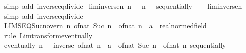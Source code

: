 \begin{isabellebody}
\ {\isacharparenleft}{\kern0pt}simp\ add{\isacharcolon}{\kern0pt}\ inverse{\isacharunderscore}{\kern0pt}eq{\isacharunderscore}{\kern0pt}divide{\isacharparenright}{\kern0pt}%
\endisatagproof
{\isafoldproof}%
%
\isadelimproof
\isanewline
%
\endisadelimproof
\isanewline
{}\isamarkupfalse%
\ lim{\isacharunderscore}{\kern0pt}inverse{\isacharunderscore}{\kern0pt}n{\isacharprime}{\kern0pt}{\isacharcolon}{\kern0pt}\ {\isachardoublequoteopen}{\isacharparenleft}{\kern0pt}{\isacharparenleft}{\kern0pt}{\isasymlambda}n{\isachardot}{\kern0pt}\ {}\ {\isacharslash}{\kern0pt}\ n{\isacharparenright}{\kern0pt}\ {\isasymlonglongrightarrow}\ {}{\isacharparenright}{\kern0pt}\ sequentially{\isachardoublequoteclose}\isanewline
%
\isadelimproof
\ \ %
\endisadelimproof
%
\isatagproof
{}\isamarkupfalse%
\ lim{\isacharunderscore}{\kern0pt}inverse{\isacharunderscore}{\kern0pt}n\isanewline
\ \ \isamarkupfalse%
\ {\isacharparenleft}{\kern0pt}simp\ add{\isacharcolon}{\kern0pt}\ inverse{\isacharunderscore}{\kern0pt}eq{\isacharunderscore}{\kern0pt}divide{\isacharparenright}{\kern0pt}%
\endisatagproof
{\isafoldproof}%
%
\isadelimproof
\isanewline
%
\endisadelimproof
\isanewline
{}\isamarkupfalse%
\ LIMSEQ{\isacharunderscore}{\kern0pt}Suc{\isacharunderscore}{\kern0pt}n{\isacharunderscore}{\kern0pt}over{\isacharunderscore}{\kern0pt}n{\isacharcolon}{\kern0pt}\ {\isachardoublequoteopen}{\isacharparenleft}{\kern0pt}{\isasymlambda}n{\isachardot}{\kern0pt}\ of{\isacharunderscore}{\kern0pt}nat\ {\isacharparenleft}{\kern0pt}Suc\ n{\isacharparenright}{\kern0pt}\ {\isacharslash}{\kern0pt}\ of{\isacharunderscore}{\kern0pt}nat\ n\ {\isacharcolon}{\kern0pt}{\isacharcolon}{\kern0pt}\ {\isacharprime}{\kern0pt}a\ {\isacharcolon}{\kern0pt}{\isacharcolon}{\kern0pt}\ real{\isacharunderscore}{\kern0pt}normed{\isacharunderscore}{\kern0pt}field{\isacharparenright}{\kern0pt}\ {\isasymlonglonglongrightarrow}\ {}{\isachardoublequoteclose}\isanewline
%
\isadelimproof
%
\endisadelimproof
%
\isatagproof
{}\isamarkupfalse%
\ {\isacharparenleft}{\kern0pt}rule\ Lim{\isacharunderscore}{\kern0pt}transform{\isacharunderscore}{\kern0pt}eventually{\isacharparenright}{\kern0pt}\isanewline
\ \ \isamarkupfalse%
\ {\isachardoublequoteopen}eventually\ {\isacharparenleft}{\kern0pt}{\isasymlambda}n{\isachardot}{\kern0pt}\ {}\ {\isacharplus}{\kern0pt}\ inverse\ {\isacharparenleft}{\kern0pt}of{\isacharunderscore}{\kern0pt}nat\ n\ {\isacharcolon}{\kern0pt}{\isacharcolon}{\kern0pt}\ {\isacharprime}{\kern0pt}a{\isacharparenright}{\kern0pt}\ {\isacharequal}{\kern0pt}\ of{\isacharunderscore}{\kern0pt}nat\ {\isacharparenleft}{\kern0pt}Suc\ n{\isacharparenright}{\kern0pt}\ {\isacharslash}{\kern0pt}\ of{\isacharunderscore}{\kern0pt}nat\ n{\isacharparenright}{\kern0pt}\ sequentially{\isachardoublequoteclose}\isanewline

\end{isabellebody}
